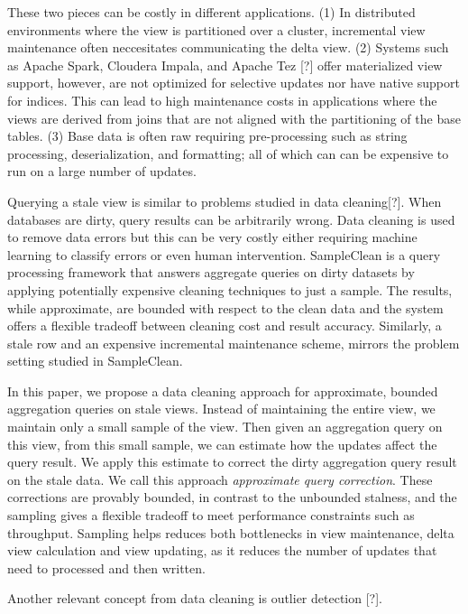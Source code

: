 \iffalse
 These two pieces can be costly in different
applications. (1) In distributed environments where the view is partitioned
over a cluster, incremental view maintenance often neccesitates communicating
the delta view. (2) Systems such as Apache Spark, Cloudera Impala,
and Apache Tez {[}?{]} offer materialized view support, however, are
not optimized for selective updates nor have native support for indices.
This can lead to high maintenance costs in applications where the
views are derived from joins that are not aligned with the partitioning
of the base tables. (3) Base data is often raw requiring pre-processing
such as string processing, deserialization, and formatting; all of
which can can be expensive to run on a large number of updates. 



Querying a stale view is similar to problems studied in data cleaning{[}?{]}.
When databases are dirty, query results can be arbitrarily wrong.
Data cleaning is used to remove data errors but this can be very costly either 
requiring machine learning to classify errors or even human intervention.
SampleClean is a query processing framework that answers aggregate
queries on dirty datasets by applying potentially expensive cleaning
techniques to just a sample. The results, while approximate, are bounded
with respect to the clean data and the system offers a flexible tradeoff
between cleaning cost and result accuracy. Similarly, a stale row
and an expensive incremental maintenance scheme, mirrors the problem
setting studied in SampleClean. 

In this paper, we propose a data cleaning approach for approximate,
bounded aggregation queries on stale views. Instead of maintaining
the entire view, we maintain only a small sample of the view. Then
given an aggregation query on this view, from this small sample, we
can estimate how the updates affect the query result. We apply this
estimate to correct the dirty aggregation query result on the stale
data. We call this approach \emph{approximate query correction}. 
These corrections are provably bounded, in contrast to the unbounded stalness,
and the sampling gives a flexible tradeoff to meet performance constraints such as throughput.
Sampling helps reduces both bottlenecks in view maintenance, delta
view calculation and view updating, as it reduces the number of updates
that need to processed and then written.

Another relevant concept from data cleaning is outlier detection {[}?{]}.

